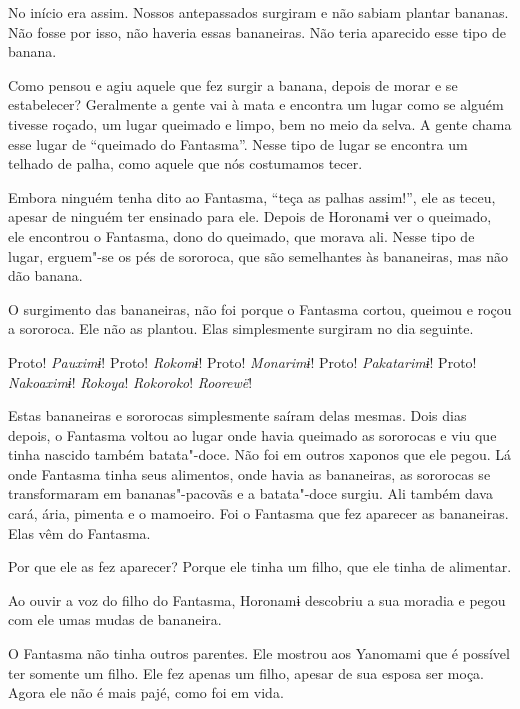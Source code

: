  

 

 No início era assim. Nossos antepassados
surgiram e não sabiam plantar bananas. Não fosse por isso, não haveria
essas bananeiras. Não teria aparecido esse tipo de banana. 

Como pensou e agiu aquele que fez surgir a banana, depois de morar e se
estabelecer? Geralmente a gente vai à mata e encontra um lugar como se
alguém tivesse roçado, um lugar queimado e limpo, bem no meio da selva.
A gente chama esse lugar de ``queimado do Fantasma''. Nesse tipo de
lugar se encontra um telhado de palha, como aquele que nós costumamos
tecer. 

Embora ninguém tenha dito ao Fantasma, ``teça as palhas assim!'', ele as
teceu, apesar de ninguém ter ensinado para ele. Depois de Horonamɨ ver o
queimado, ele encontrou o Fantasma, dono do queimado, que morava ali.
Nesse tipo de lugar, erguem"-se os pés de sororoca, que são semelhantes
às bananeiras, mas não dão banana. 

O surgimento das bananeiras, não foi porque o Fantasma cortou, queimou e
roçou a sororoca. Ele não as plantou. Elas simplesmente surgiram no dia
seguinte. 

Proto! \emph{Pauximɨ}! Proto! \emph{Rokomɨ}! Proto! \emph{Monarimɨ}!
Proto! \emph{Pakatarimɨ}!
Proto! \emph{Nakoaximɨ}! \emph{Rokoya}! \emph{Rokoroko}! \emph{Roorewë}! 

Estas bananeiras e sororocas simplesmente saíram delas mesmas. Dois dias depois, o Fantasma voltou ao lugar onde havia queimado as sororocas e viu que tinha nascido
também batata"-doce. Não foi em outros xaponos que ele pegou. Lá onde
Fantasma tinha seus alimentos, onde havia as bananeiras, as sororocas se
transformaram em bananas"-pacovãs e a batata"-doce surgiu. Ali também dava
cará, ária, pimenta e o mamoeiro. Foi o Fantasma que fez aparecer as
bananeiras. Elas vêm do Fantasma. 

Por que ele as fez aparecer? Porque ele tinha um filho, que ele tinha de
alimentar. 

Ao ouvir a voz do filho do Fantasma, Horonamɨ descobriu a sua moradia e
pegou com ele umas mudas de bananeira. 

O Fantasma não tinha outros parentes. Ele mostrou aos Yanomami que é
possível ter somente um filho. Ele fez apenas um filho, apesar de sua
esposa ser moça. Agora ele não é mais pajé, como foi em vida. 

